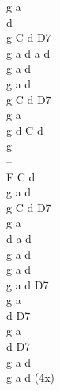 \begin{chord}
g a\\
d\\
g C d D7\\
g a d a d\\
g a d\\

g a d\\
g C d D7\\
g a\\

g d C d\\
g\\
--\\
F C d\\

g a d\\
g C d D7\\
g a\\
d a d\\

g a d\\
g a d\\

g a d D7\\
g a\\
d D7\\
g a\\
d D7\\
g a d\\
g a d (4x)\\
\end{chord}

